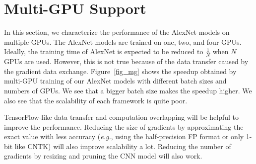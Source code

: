 \section{Multi-GPU Support}
\label{multi-GPU}
In this section, we characterize the performance of the AlexNet models on multiple GPUs. The AlexNet models are trained on one, two, and four GPUs. Ideally, the training time of AlexNet is expected to be reduced to $\frac{1}{N}$ when $N$ GPUs are used. However, this is not true because of the data transfer caused by the gradient data exchange. Figure~\ref{fig_mg} shows the speedup obtained by multi-GPU training of our AlexNet models with different batch sizes and numbers of GPUs. We see that a bigger batch size makes the speedup higher. We also see that the scalability of each framework is quite poor. 

TensorFlow-like data transfer and computation overlapping will be helpful to improve the performance. Reducing the size of gradients by approximating the exact value with less accuracy (\textit{e.g.}, using the half-precision FP format or only 1-bit like CNTK) will also improve scalability a lot. Reducing the number of gradients by resizing and pruning the CNN model will also work.
